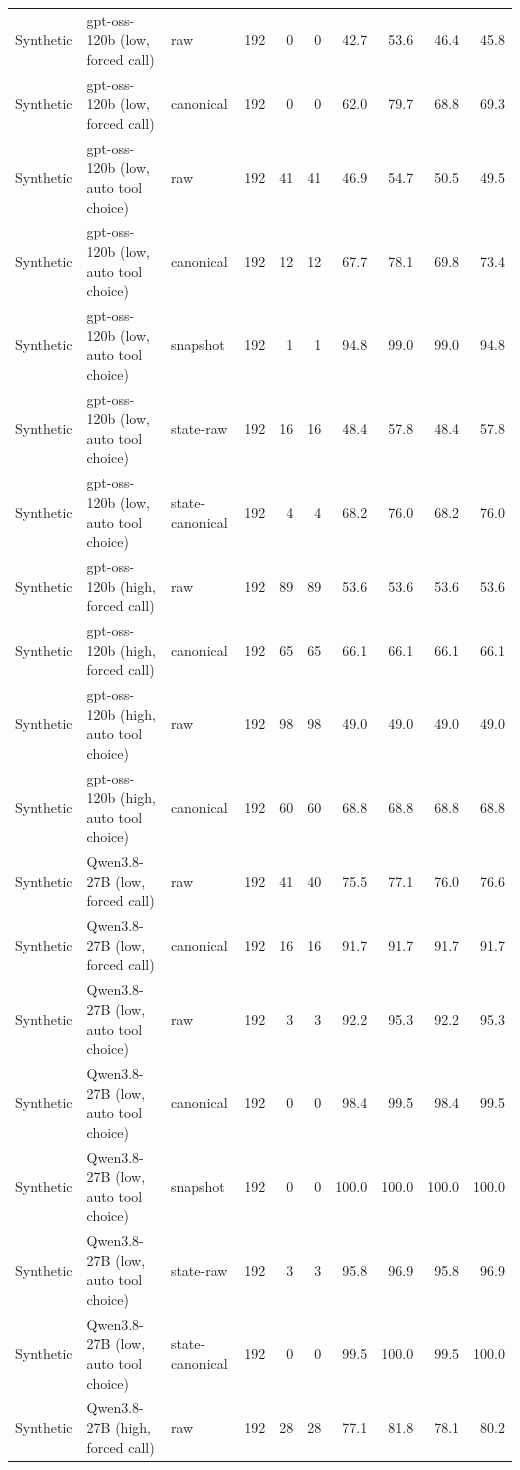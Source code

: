 {\begin{longtable}{lllrrrrrrr}
Synthetic & gpt-oss-120b (low, forced call) & raw & 192 & 0 & 0 & 42.7 & 53.6 & 46.4 & 45.8 \\
Synthetic & gpt-oss-120b (low, forced call) & canonical & 192 & 0 & 0 & 62.0 & 79.7 & 68.8 & 69.3 \\
Synthetic & gpt-oss-120b (low, auto tool choice) & raw & 192 & 41 & 41 & 46.9 & 54.7 & 50.5 & 49.5 \\
Synthetic & gpt-oss-120b (low, auto tool choice) & canonical & 192 & 12 & 12 & 67.7 & 78.1 & 69.8 & 73.4 \\
Synthetic & gpt-oss-120b (low, auto tool choice) & snapshot & 192 & 1 & 1 & 94.8 & 99.0 & 99.0 & 94.8 \\
Synthetic & gpt-oss-120b (low, auto tool choice) & state-raw & 192 & 16 & 16 & 48.4 & 57.8 & 48.4 & 57.8 \\
Synthetic & gpt-oss-120b (low, auto tool choice) & state-canonical & 192 & 4 & 4 & 68.2 & 76.0 & 68.2 & 76.0 \\
Synthetic & gpt-oss-120b (high, forced call) & raw & 192 & 89 & 89 & 53.6 & 53.6 & 53.6 & 53.6 \\
Synthetic & gpt-oss-120b (high, forced call) & canonical & 192 & 65 & 65 & 66.1 & 66.1 & 66.1 & 66.1 \\
Synthetic & gpt-oss-120b (high, auto tool choice) & raw & 192 & 98 & 98 & 49.0 & 49.0 & 49.0 & 49.0 \\
Synthetic & gpt-oss-120b (high, auto tool choice) & canonical & 192 & 60 & 60 & 68.8 & 68.8 & 68.8 & 68.8 \\
Synthetic & Qwen3.8-27B (low, forced call) & raw & 192 & 41 & 40 & 75.5 & 77.1 & 76.0 & 76.6 \\
Synthetic & Qwen3.8-27B (low, forced call) & canonical & 192 & 16 & 16 & 91.7 & 91.7 & 91.7 & 91.7 \\
Synthetic & Qwen3.8-27B (low, auto tool choice) & raw & 192 & 3 & 3 & 92.2 & 95.3 & 92.2 & 95.3 \\
Synthetic & Qwen3.8-27B (low, auto tool choice) & canonical & 192 & 0 & 0 & 98.4 & 99.5 & 98.4 & 99.5 \\
Synthetic & Qwen3.8-27B (low, auto tool choice) & snapshot & 192 & 0 & 0 & 100.0 & 100.0 & 100.0 & 100.0 \\
Synthetic & Qwen3.8-27B (low, auto tool choice) & state-raw & 192 & 3 & 3 & 95.8 & 96.9 & 95.8 & 96.9 \\
Synthetic & Qwen3.8-27B (low, auto tool choice) & state-canonical & 192 & 0 & 0 & 99.5 & 100.0 & 99.5 & 100.0 \\
Synthetic & Qwen3.8-27B (high, forced call) & raw & 192 & 28 & 28 & 77.1 & 81.8 & 78.1 & 80.2 \\

\end{longtable}}
